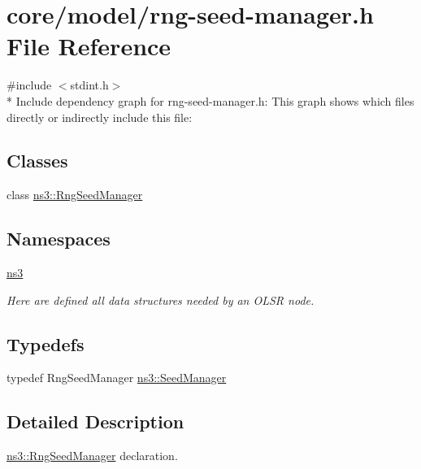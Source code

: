 \hypertarget{rng-seed-manager_8h}{}\section{core/model/rng-\/seed-\/manager.h File Reference}
\label{rng-seed-manager_8h}
{\ttfamily \#include $<$stdint.\+h$>$}\\*
Include dependency graph for rng-\/seed-\/manager.h\+:
This graph shows which files directly or indirectly include this file\+:
\subsection*{Classes}
\begin{DoxyCompactItemize}
\item 
class \hyperlink{classns3_1_1RngSeedManager}{ns3\+::\+Rng\+Seed\+Manager}
\end{DoxyCompactItemize}
\subsection*{Namespaces}
\begin{DoxyCompactItemize}
\item 
 \hyperlink{namespacens3}{ns3}
\begin{DoxyCompactList}\small\item\em Here are defined all data structures needed by an O\+L\+SR node. \end{DoxyCompactList}\end{DoxyCompactItemize}
\subsection*{Typedefs}
\begin{DoxyCompactItemize}
\item 
typedef Rng\+Seed\+Manager \hyperlink{namespacens3_a61dc84a81b179476db87d3d546409964}{ns3\+::\+Seed\+Manager}
\end{DoxyCompactItemize}


\subsection{Detailed Description}
\hyperlink{classns3_1_1RngSeedManager}{ns3\+::\+Rng\+Seed\+Manager} declaration. 